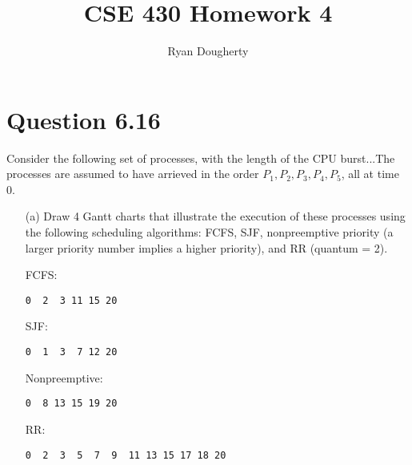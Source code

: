 \documentclass[12pt]{article}
\title{CSE 430 Homework 4}
\author{Ryan Dougherty}
\date{}                                           %
\begin{document}
\maketitle

\section*{Question 6.16} {\color{blue}Consider the following set of processes, with the length of the CPU burst...The processes are assumed to have arrieved in the order $P_{1}, P_{2}, P_{3}, P_{4}, P_{5}$, all at time 0.
\begin{enumerate}
\item[(a)]Draw 4 Gantt charts that illustrate the execution of these processes using the following scheduling algorithms: FCFS, SJF, nonpreemptive priority (a larger priority number implies a higher priority), and RR (quantum = 2).
\\
{\color{black}
FCFS: \\
\begin{verbatim}
0  2  3 11 15 20
\end{verbatim}

SJF: \\
\begin{verbatim}
0  1  3  7 12 20
\end{verbatim}

Nonpreemptive: \\
\begin{verbatim}
0  8 13 15 19 20
\end{verbatim}

RR: \\
\begin{verbatim}
0  2  3  5  7  9  11 13 15 17 18 20
\end{verbatim}

}


\end{enumerate}}
\end{document}

